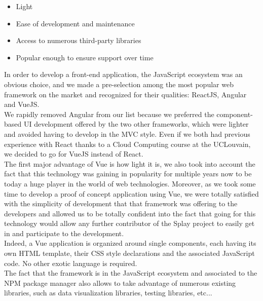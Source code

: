 \documentclass{eplmastersthesis}
\begin{document}
        \begin{itemize}
          \item Light
          \item Ease of development and maintenance
          \item Access to numerous third-party libraries
          \item Popular enough to ensure support over time
        \end{itemize}

        In order to develop a front-end application, the JavaScript ecosystem
        was an obvious choice, and we made a pre-selection among the most
        popular web framework on the market and recognized for their qualities:
        ReactJS, Angular and VueJS.\\
        We rapidly removed Angular from our list because we preferred the
        component-based UI development offered by the two other frameworks,
        which were lighter and avoided having to develop in the MVC style.
        Even if we both had previous experience with React thanks to a
        Cloud Computing course at the UCLouvain, we decided to go for VueJS
        instead of React.\\

        The first major advantage of Vue is how light it is, we also took into
        account the fact that this technology was gaining in popularity for
        multiple years now to be today a huge player in the world of web
        technologies. Moreover, as we took some time to develop a proof
        of concept application using Vue, we were totally satisfied with the
        simplicity of development that that framework was offering to the
        developers and allowed us to be totally confident into the fact
        that going for this technology would allow any further contributor
        of the Splay project to easily get in and participate to the
        development.\\
        Indeed, a Vue application is organized around single components, each
        having its own HTML template, their CSS style declarations and
        the associated JavaScript code. No other exotic language is required.\\
        The fact that the framework is in the JavaScript ecosystem and
        associated to the NPM package manager also allows to take advantage of
        numerous existing libraries, such as data visualization libraries,
        testing libraries, etc... \\
\end{document}
